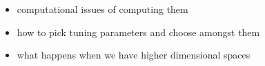 \documentclass[xetex,mathserif,serif,aspectratio=169]{beamer}
\begin{document}
\begin{frame}[fragile] \frametitle{} \oldB \small


\begin{itemize}
\item computational issues of computing them
\item how to pick tuning parameters and choose amongst them
\item what happens when we have higher dimensional spaces
\end{itemize}

\end{frame}
\end{document}
